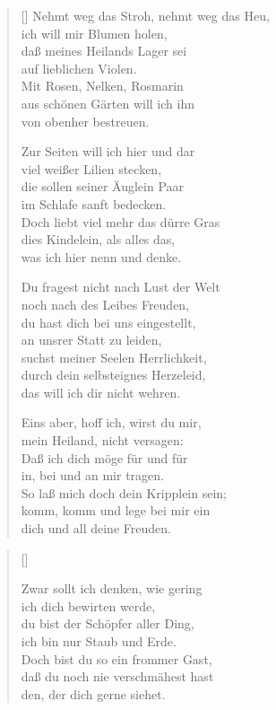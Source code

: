 \begin{multicols}{2}
\begin{verse}[\versewidth]
 Nehmt weg das Stroh, nehmt weg das Heu,\\
ich will mir Blumen holen,\\
daß meines Heilands Lager sei\\
auf lieblichen Violen.\\
Mit Rosen, Nelken, Rosmarin\\
aus schönen Gärten will ich ihn\\
von obenher bestreuen.
 
 Zur Seiten will ich hier und dar\\
viel weißer Lilien stecken,\\
die sollen seiner Äuglein Paar\\
im Schlafe sanft bedecken.\\
Doch liebt viel mehr das dürre Gras\\
dies Kindelein, als alles das,\\
was ich hier nenn und denke.
 
 Du fragest nicht nach Lust der Welt\\
noch nach des Leibes Freuden,\\
du hast dich bei uns eingestellt,\\
an unsrer Statt zu leiden,\\
suchst meiner Seelen Herrlichkeit,\\
durch dein selbsteignes Herzeleid,\\
das will ich dir nicht wehren.
 
 Eins aber, hoff ich, wirst du mir,\\
mein Heiland, nicht versagen:\\
Daß ich dich möge für und für\\
in, bei und an mir tragen.\\
So laß mich doch dein Kripplein sein;\\
komm, komm und lege bei mir ein\\
dich und all deine Freuden.

\end{verse}
\end{multicols}


\begin{center}
\settowidth{\versewidth}{Zwar sollt ich denken, wie gering,}
\begin{verse}[\versewidth]

 Zwar sollt ich denken, wie gering\\
ich dich bewirten werde,\\
du bist der Schöpfer aller Ding,\\
ich bin nur Staub und Erde.\\
Doch bist du so ein frommer Gast,\\
daß du noch nie verschmähest hast\\
den, der dich gerne siehet.
  
  
\end{verse}
\end{center}




